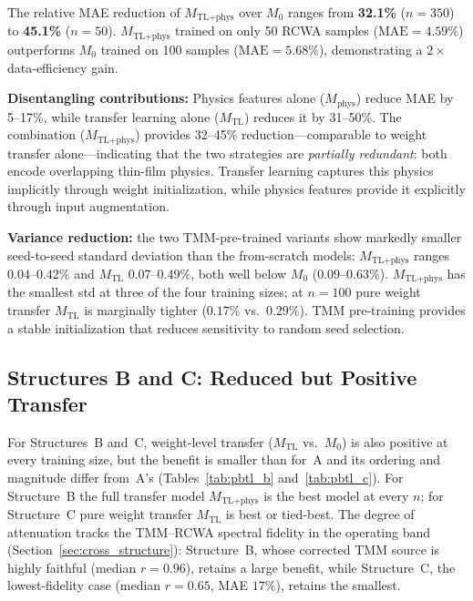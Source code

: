 \documentclass[a4paper,fleqn]{cas-sc}
\newcommand{\Mzero}{M_0}
\newcommand{\Mphys}{M_\text{phys}}
\newcommand{\Mtl}{M_\text{TL}}
\newcommand{\Mtlphys}{M_\text{TL+phys}}
\newcommand{\MAE}{\text{MAE}}
\begin{document}
The relative MAE reduction of $\Mtlphys$ over $\Mzero$ ranges from \textbf{32.1\%} ($n=350$) to \textbf{45.1\%} ($n=50$). $\Mtlphys$ trained on only 50 RCWA samples ($\MAE = 4.59\%$) outperforms $\Mzero$ trained on 100 samples ($\MAE = 5.68\%$), demonstrating a $2\times$ data-efficiency gain.

\textbf{Disentangling contributions:} Physics features alone ($\Mphys$) reduce MAE by 5--17\%, while transfer learning alone ($\Mtl$) reduces it by 31--50\%. The combination ($\Mtlphys$) provides 32--45\% reduction---comparable to weight transfer alone---indicating that the two strategies are \emph{partially redundant}: both encode overlapping thin-film physics. Transfer learning captures this physics implicitly through weight initialization, while physics features provide it explicitly through input augmentation.

\textbf{Variance reduction:} the two TMM-pre-trained variants show markedly smaller seed-to-seed standard deviation than the from-scratch models: $\Mtlphys$ ranges $0.04$--$0.42\%$ and $\Mtl$ $0.07$--$0.49\%$, both well below $\Mzero$ ($0.09$--$0.63\%$). $\Mtlphys$ has the smallest std at three of the four training sizes; at $n=100$ pure weight transfer $\Mtl$ is marginally tighter ($0.17\%$ vs.\ $0.29\%$). TMM pre-training provides a stable initialization that reduces sensitivity to random seed selection.


\subsection{Structures B and C: Reduced but Positive Transfer}
\label{sec:results_b}

For Structures~B and~C, weight-level transfer ($\Mtl$ vs.\ $\Mzero$) is also positive at every training size, but the benefit is smaller than for~A and its ordering and magnitude differ from~A's (Tables~\ref{tab:pbtl_b} and~\ref{tab:pbtl_c}). For Structure~B the full transfer model $\Mtlphys$ is the best model at every $n$; for Structure~C pure weight transfer $\Mtl$ is best or tied-best. The degree of attenuation tracks the TMM--RCWA spectral fidelity in the operating band (Section~\ref{sec:cross_structure}): Structure~B, whose corrected TMM source is highly faithful (median $r=0.96$), retains a large benefit, while Structure~C, the lowest-fidelity case (median $r=0.65$, MAE $17\%$), retains the smallest.
\end{document}
